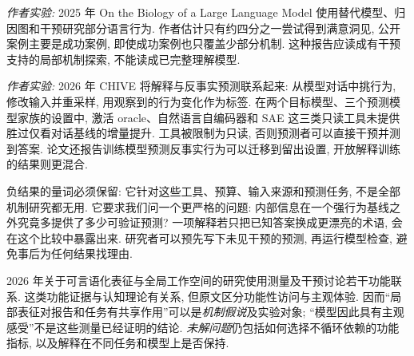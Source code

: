 \emph{作者实验:} 2025 年 On the Biology of a Large Language Model 使用替代模型、归因图和干预研究部分语言行为\cite{biology}. 作者估计只有约四分之一尝试得到满意洞见, 公开案例主要是成功案例, 即使成功案例也只覆盖少部分机制. 这种报告应读成有干预支持的局部机制探索, 不能读成已完整理解模型.

\emph{作者实验:} 2026 年 CHIVE 将解释与反事实预测联系起来: 从模型对话中挑行为, 修改输入并重采样, 用观察到的行为变化作为标签. 在两个目标模型、三个预测模型家族的设置中, 激活 oracle、自然语言自编码器和 SAE 这三类只读工具未提供胜过仅看对话基线的增量提升. 工具被限制为只读, 否则预测者可以直接干预并测到答案. 论文还报告训练模型预测反事实行为可以迁移到留出设置, 开放解释训练的结果则更混合\cite{chive}.

负结果的量词必须保留: 它针对这些工具、预算、输入来源和预测任务, 不是全部机制研究都无用. 它要求我们问一个更严格的问题: 内部信息在一个强行为基线之外究竟多提供了多少可验证预测? 一项解释若只把已知答案换成更漂亮的术语, 会在这个比较中暴露出来. 研究者可以预先写下未见干预的预测, 再运行模型检查, 避免事后为任何结果找理由.

2026 年关于可言语化表征与全局工作空间的研究使用测量及干预讨论若干功能联系\cite{workspace}. 这类功能证据与认知理论有关系, 但原文区分功能性访问与主观体验. 因而“局部表征对报告和任务有共享作用”可以是\emph{机制假说}及实验对象; “模型因此具有主观感受”不是这些测量已经证明的结论. \emph{未解问题}仍包括如何选择不循环依赖的功能指标, 以及解释在不同任务和模型上是否保持.

